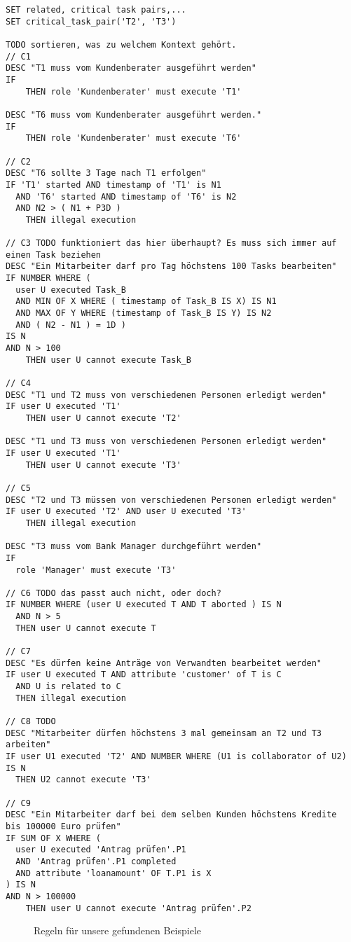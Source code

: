 \begin{verbatim}
SET related, critical task pairs,...
SET critical_task_pair('T2', 'T3')

TODO sortieren, was zu welchem Kontext gehört.
// C1
DESC "T1 muss vom Kundenberater ausgeführt werden"
IF
    THEN role 'Kundenberater' must execute 'T1'

DESC "T6 muss vom Kundenberater ausgeführt werden."
IF
    THEN role 'Kundenberater' must execute 'T6'

// C2
DESC "T6 sollte 3 Tage nach T1 erfolgen"
IF 'T1' started AND timestamp of 'T1' is N1
  AND 'T6' started AND timestamp of 'T6' is N2
  AND N2 > ( N1 + P3D )
    THEN illegal execution

// C3 TODO funktioniert das hier überhaupt? Es muss sich immer auf einen Task beziehen
DESC "Ein Mitarbeiter darf pro Tag höchstens 100 Tasks bearbeiten"
IF NUMBER WHERE ( 
  user U executed Task_B 
  AND MIN OF X WHERE ( timestamp of Task_B IS X) IS N1
  AND MAX OF Y WHERE (timestamp of Task_B IS Y) IS N2 
  AND ( N2 - N1 ) = 1D ) 
IS N 
AND N > 100
    THEN user U cannot execute Task_B

// C4
DESC "T1 und T2 muss von verschiedenen Personen erledigt werden"
IF user U executed 'T1'
    THEN user U cannot execute 'T2'

DESC "T1 und T3 muss von verschiedenen Personen erledigt werden"
IF user U executed 'T1'
    THEN user U cannot execute 'T3'

// C5
DESC "T2 und T3 müssen von verschiedenen Personen erledigt werden"
IF user U executed 'T2' AND user U executed 'T3'
    THEN illegal execution

DESC "T3 muss vom Bank Manager durchgeführt werden"
IF
  role 'Manager' must execute 'T3'

// C6 TODO das passt auch nicht, oder doch?
IF NUMBER WHERE (user U executed T AND T aborted ) IS N
  AND N > 5
  THEN user U cannot execute T

// C7
DESC "Es dürfen keine Anträge von Verwandten bearbeitet werden"
IF user U executed T AND attribute 'customer' of T is C
  AND U is related to C
  THEN illegal execution

// C8 TODO
DESC "Mitarbeiter dürfen höchstens 3 mal gemeinsam an T2 und T3 arbeiten"
IF user U1 executed 'T2' AND NUMBER WHERE (U1 is collaborator of U2) IS N
  THEN U2 cannot execute 'T3'

// C9
DESC "Ein Mitarbeiter darf bei dem selben Kunden höchstens Kredite
bis 100000 Euro prüfen"
IF SUM OF X WHERE (
  user U executed 'Antrag prüfen'.P1 
  AND 'Antrag prüfen'.P1 completed 
  AND attribute 'loanamount' OF T.P1 is X 
) IS N
AND N > 100000
    THEN user U cannot execute 'Antrag prüfen'.P2
\end{verbatim}
\begin{figure}[!h]
\caption{Regeln für unsere gefundenen Beispiele}
\label{fig:resultrulefile}
\end{figure}
\normalsize

